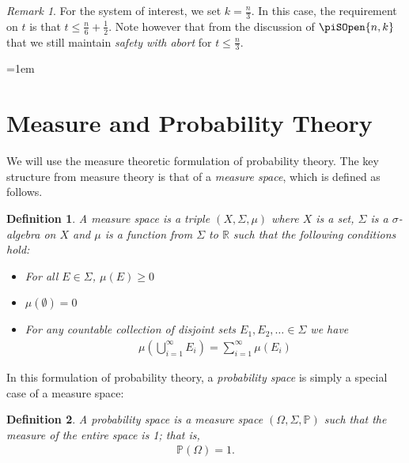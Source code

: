 \documentclass{article}
\newtheorem{definition}{Definition}
\theoremstyle{remark}
\newtheorem{remark}{Remark}
\renewcommand{\P}{\mathbb{P}}
\begin{document}
\begin{remark}
	For the system of interest, we set $k = \frac{n}{3}$. In this case, the
	requirement on $t$ is that $t \le \frac{n}{6} + \frac{1}{2}$. Note however
	that from the discussion of $\piSOpen{n,k}$ that we still maintain
	\textit{safety with abort} for $t \le \frac{n}{3}$.
\end{remark}

\newpage
{%
	\emergencystretch=1em

	\printbibliography{}
}

\newpage
\appendix

\section{Measure and Probability Theory}\label{app:prob}

We will use the measure theoretic formulation of probability theory. The key
structure from measure theory is that of a \textit{measure space}, which is
defined as follows.

\begin{definition}
	A measure space is a triple $(X, \Sigma, \mu)$ where $X$ is a set, $\Sigma$
	is a $\sigma$-algebra on $X$ and $\mu$ is a function from $\Sigma$ to
	$\mathbb{R}$ such that the following conditions hold:
	\begin{itemize}
		\item For all $E \in \Sigma$, $\mu(E) \ge 0$
		\item $\mu(\emptyset) = 0$
		\item For any countable collection of disjoint sets $E_1, E_2, \ldots
			\in \Sigma$ we have
			\begin{align*}
				\mu\left(\bigcup_{i=1}^\infty E_i\right) =
				\sum_{i=1}^\infty \mu(E_i)
			\end{align*}
	\end{itemize}
\end{definition}

In this formulation of probability theory, a \textit{probability space} is
simply a special case of a measure space:

\begin{definition}
	A probability space is a measure space $(\Omega, \Sigma, \P)$ such that the
	measure of the entire space is 1; that is,
	\begin{align*}
		\P(\Omega) = 1.
	\end{align*}
\end{definition}
\end{document}
